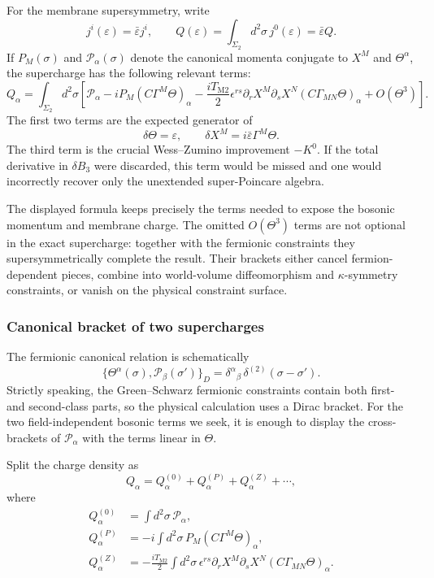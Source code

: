 \documentclass[
  10pt,
  a4paper,
  openany]{book}
\begin{document}
For the membrane supersymmetry, write \[
j^i(\varepsilon)=\bar\varepsilon j^i,
\qquad
Q(\varepsilon)=\int_{\Sigma_2}d^2\sigma\,j^0(\varepsilon)
=\bar\varepsilon Q.
\] If \(P_M(\sigma)\) and \(\mathscr P_\alpha(\sigma)\) denote the
canonical momenta conjugate to \(X^M\) and \(\Theta^\alpha\), the
supercharge has the following relevant terms: \[
\boxed{
Q_\alpha
=\int_{\Sigma_2}d^2\sigma
\left[
\mathscr P_\alpha
-iP_M(C\Gamma^M\Theta)_\alpha
-\frac{iT_{\mathrm{M2}}}{2}
\epsilon^{rs}\partial_rX^M\partial_sX^N
(C\Gamma_{MN}\Theta)_\alpha
+O(\Theta^3)
\right]
}.
\] The first two terms are the expected generator of \[
\delta\Theta=\varepsilon,
\qquad
\delta X^M=i\bar\varepsilon\Gamma^M\Theta.
\] The third term is the crucial Wess--Zumino improvement \(-K^0\). If
the total derivative in \(\delta B_3\) were discarded, this term would
be missed and one would incorrectly recover only the unextended
super-Poincare algebra.

The displayed formula keeps precisely the terms needed to expose the
bosonic momentum and membrane charge. The omitted \(O(\Theta^3)\) terms
are not optional in the exact supercharge: together with the fermionic
constraints they supersymmetrically complete the result. Their brackets
either cancel fermion-dependent pieces, combine into world-volume
diffeomorphism and \(\kappa\)-symmetry constraints, or vanish on the
physical constraint surface.

\subsubsection{Canonical bracket of two
supercharges}\label{canonical-bracket-of-two-supercharges}

The fermionic canonical relation is schematically \[
\{\Theta^\alpha(\sigma),
\mathscr P_\beta(\sigma')\}_{D}
=\delta^\alpha{}_{\beta}\,
\delta^{(2)}(\sigma-\sigma').
\] Strictly speaking, the Green--Schwarz fermionic constraints contain
both first- and second-class parts, so the physical calculation uses a
Dirac bracket. For the two field-independent bosonic terms we seek, it
is enough to display the cross-brackets of \(\mathscr P_\alpha\) with
the terms linear in \(\Theta\).

Split the charge density as \[
Q_\alpha=Q^{(0)}_\alpha+Q^{(P)}_\alpha+Q^{(Z)}_\alpha+\cdots,
\] where \[
\begin{aligned}
Q^{(0)}_\alpha
&=\int d^2\sigma\,\mathscr P_\alpha,\\
Q^{(P)}_\alpha
&=-i\int d^2\sigma\,
P_M(C\Gamma^M\Theta)_\alpha,\\
Q^{(Z)}_\alpha
&=-\frac{iT_{\mathrm{M2}}}{2}
\int d^2\sigma\,
\epsilon^{rs}\partial_rX^M\partial_sX^N
(C\Gamma_{MN}\Theta)_\alpha.
\end{aligned}
\]
\end{document}
